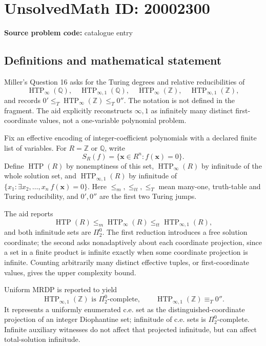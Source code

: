 \documentclass[11pt]{article}
\begin{document}
\section*{UnsolvedMath ID: 20002300}
\textbf{Source problem code:} catalogue entry
\subsection{Definitions and mathematical statement}
Miller's Question 16 asks for the Turing degrees and relative reducibilities of
\[
 \operatorname{HTP}_{\infty}(\mathbb Q),\quad
 \operatorname{HTP}_{\infty,1}(\mathbb Q),\quad
 \operatorname{HTP}_{\infty}(\mathbb Z),\quad
 \operatorname{HTP}_{\infty,1}(\mathbb Z),
\]
and records \(0'\leq_T\operatorname{HTP}_\infty(\mathbb Z)\leq_T0''\). The notation is not defined in the fragment. The aid explicitly reconstructs \(\infty,1\) as infinitely many distinct first-coordinate values, not a one-variable polynomial problem.

Fix an effective encoding of integer-coefficient polynomials with a declared finite list of variables. For \(R=\mathbb Z\) or \(\mathbb Q\), write
\[
 S_R(f)=\{\mathbf x\in R^n:f(\mathbf x)=0\}.
\]
Define \(\operatorname{HTP}(R)\) by nonemptiness of this set, \(\operatorname{HTP}_\infty(R)\) by infinitude of the whole solution set, and \(\operatorname{HTP}_{\infty,1}(R)\) by infinitude of \(\{x_1:\exists x_2,\ldots,x_n\ f(\mathbf x)=0\}\). Here \(\leq_m,\leq_{tt},\leq_T\) mean many-one, truth-table and Turing reducibility, and \(0',0''\) are the first two Turing jumps.

The aid reports
\[
 \operatorname{HTP}(R)\leq_m\operatorname{HTP}_\infty(R)
 \leq_{tt}\operatorname{HTP}_{\infty,1}(R),
\]
and both infinitude sets are \(\Pi^0_2\). The first reduction introduces a free solution coordinate; the second asks nonadaptively about each coordinate projection, since a set in a finite product is infinite exactly when some coordinate projection is infinite. Counting arbitrarily many distinct effective tuples, or first-coordinate values, gives the upper complexity bound.

Uniform MRDP is reported to yield
\[
 \operatorname{HTP}_{\infty,1}(\mathbb Z)
 \text{ is }\Pi^0_2\text{-complete},\qquad
 \operatorname{HTP}_{\infty,1}(\mathbb Z)\equiv_T0''.
\]
It represents a uniformly enumerated c.e. set as the distinguished-coordinate projection of an integer Diophantine set; infinitude of c.e. sets is \(\Pi^0_2\)-complete. Infinite auxiliary witnesses do not affect that projected infinitude, but can affect total-solution infinitude.
\end{document}
